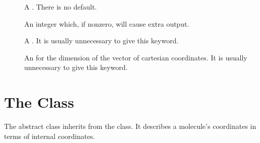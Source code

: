 \begin{description}
  \item[] A 
    .  There is no default.

  \item[] An integer which, if nonzero, will cause extra
    output.

  \item[] A 
    .  It is usually unnecessary to give this
    keyword.

  \item[] An 
     for the dimension of the vector of
    cartesian coordinates.  It is usually unnecessary to give this keyword.
\end{description}


\section{The  Class}\label{IntMolecularCoor}

The  abstract class inherits from the
 class.  It describes a molecule's coordinates in
terms of internal coordinates.

